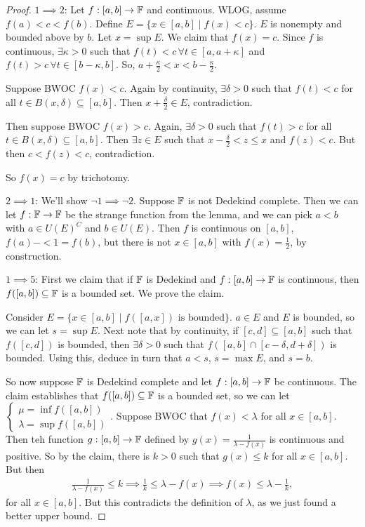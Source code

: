 \documentclass{report}
\begin{document}
\begin{proof}
    $1 \implies 2$: Let $f: [a, b] \to \FF$ and continuous. WLOG, assume $f(a) < c < f(b)$. Define $E = \{x \in [a,b] \mid f(x) < c\}$. $E$ is nonempty and bounded above by $b$. Let $x = \sup E$. We claim that $f(x) = c$. Since $f$ is continuous, $\exists \kappa > 0$ such that $f(t) < c \, \forall t \in [a, a + \kappa]$ and $f(t) > c \, \forall t \in [b - \kappa, b]$. So, $a + \frac \kappa 2 < x < b - \frac \kappa 2$. 

    Suppose BWOC $f(x) < c$. Again by continuity, $\exists \delta > 0$ such that $f(t) < c$ for all $t \in B(x, \delta) \subseteq [a, b]$. Then $x + \frac \delta 2 \in E$, contradiction. 

    Then suppose BWOC $f(x) > c$. Again, $\exists \delta > 0$ such that $f(t) > c$ for all $t \in B(x, \delta) \subseteq [a, b]$. Then $\exists z \in E$ such that $x - \frac \delta 2 < z  \leq x$ and $f(z) < c$. But then $c < f(z) < c$, contradiction. 

    So $f(x) = c$ by trichotomy.

    $2 \implies 1$: We'll show $\neg 1 \implies \neg 2$. Suppose $\FF$ is not Dedekind complete. Then we can let $f : \FF \to \FF$ be the strange function from the lemma, and we can pick $a < b$ with $a \in U(E)^C$ and $b \in U(E)$. Then $f$ is continuous on $[a, b]$, $f(a) - < 1 = f(b)$, but there is not $x \in [a,b]$ with $f(x) = \frac 12$, by construction.

    $1 \implies 5$: First we claim that if $\FF$ is Dedekind and $f: [a, b]\to \FF$ is continuous, then $f([a, b]) \subseteq \FF$ is a bounded set. We prove the claim.

    Consider $E = \{x \in [a, b] \mid f([a, x]) \text{ is bounded}\}$. $a \in E$ and $E$ is bounded, so we can let $s = \sup E$. Next note that by continuity, if $[c,d] \subseteq [a, b]$ such that $f([c, d])$ is bounded, then $\exists \delta  > 0$ such that $f([a,b] \cap [c - \delta, d + \delta])$ is bounded. Using this, deduce in turn that $a < s$, $s = \max E$, and $s = b$. 

    So now suppose $\FF$ is Dedekind complete and let $f: [a,b] \to \FF$ be continuous. The claim establishes that $f([a, b]) \subseteq \FF$ is a bounded set, so we can let$
    \begin{cases} \mu = \inf f([a, b]) \\ \lambda = \sup f([a, b]) \end{cases}$. Suppose BWOC that $f(x) < \lambda$ for all $x \in [a, b]$. Then teh function $g: [a,b] \to \FF$ defined by $g(x) = \frac{1}{\lambda - f(x)}$ is continuous and positive. So by the claim, there is $k > 0$ such that $g(x) \leq k$ for all $x \in [a, b]$. But then 
    \begin{align*}
        \frac{1}{\lambda - f(x)} \leq k \implies \frac 1k \leq \lambda - f(x) \implies f(x) \leq \lambda - \frac 1k,
    \end{align*}
    for all $x \in [a,b]$. But this contradicts the definition of $\lambda$, as we just found a better upper bound.


\end{proof}
\end{document}

